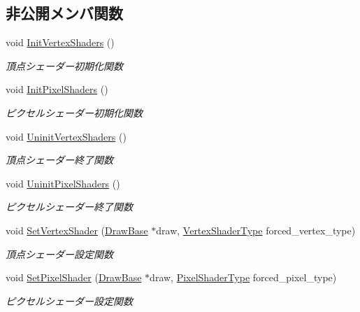 \subsection*{非公開メンバ関数}
\begin{DoxyCompactItemize}
\item 
void \mbox{\hyperlink{class_shader_manager_a9881e89daff32662e10f6ac48212ca06}{Init\+Vertex\+Shaders}} ()
\begin{DoxyCompactList}\small\item\em 頂点シェーダー初期化関数 \end{DoxyCompactList}\item 
void \mbox{\hyperlink{class_shader_manager_a6e1c2dc6c381081bc0e5ef1624b8e0f0}{Init\+Pixel\+Shaders}} ()
\begin{DoxyCompactList}\small\item\em ピクセルシェーダー初期化関数 \end{DoxyCompactList}\item 
void \mbox{\hyperlink{class_shader_manager_af3b8f2931857016315e018041321f35a}{Uninit\+Vertex\+Shaders}} ()
\begin{DoxyCompactList}\small\item\em 頂点シェーダー終了関数 \end{DoxyCompactList}\item 
void \mbox{\hyperlink{class_shader_manager_a1edd1b68c7949022217f98bce8360d3c}{Uninit\+Pixel\+Shaders}} ()
\begin{DoxyCompactList}\small\item\em ピクセルシェーダー終了関数 \end{DoxyCompactList}\item 
void \mbox{\hyperlink{class_shader_manager_a3661a079ae4e9e7e4d5da35f2171b41e}{Set\+Vertex\+Shader}} (\mbox{\hyperlink{class_draw_base}{Draw\+Base}} $\ast$draw, \mbox{\hyperlink{class_shader_manager_a9b51e49d70eb3cc58f6d1f3994e8cfbd}{Vertex\+Shader\+Type}} forced\+\_\+vertex\+\_\+type)
\begin{DoxyCompactList}\small\item\em 頂点シェーダー設定関数 \end{DoxyCompactList}\item 
void \mbox{\hyperlink{class_shader_manager_a6c954293001a33fafff216ff719618d5}{Set\+Pixel\+Shader}} (\mbox{\hyperlink{class_draw_base}{Draw\+Base}} $\ast$draw, \mbox{\hyperlink{class_shader_manager_a7d15d773b3c6a99dd7086c45c8b0be5f}{Pixel\+Shader\+Type}} forced\+\_\+pixel\+\_\+type)
\begin{DoxyCompactList}\small\item\em ピクセルシェーダー設定関数 \end{DoxyCompactList}\item 

\end{DoxyCompactItemize}
